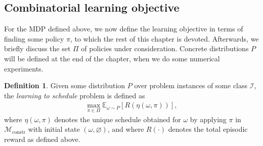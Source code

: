 \documentclass{report}
\theoremstyle{definition}
\newtheorem{define}{Definition}[chapter]
\theoremstyle{plain}
\newtheorem*{remark}{Remark}
\begin{document}

\clearpage
\subsection{Combinatorial learning objective}

For the MDP defined above, we now define the learning objective in terms of
finding some policy $\pi$, to which the rest of this chapter is devoted.
%
Afterwards, we briefly discuss the set $\Pi$ of policies under consideration.
Concrete distributions $P$ will be defined at the end of the chapter, when we do
some numerical experiments.

\begin{mdframed}[%
  innertopmargin=0.3em,
  innerbottommargin=0.9em,
  skipabove=1.5em,
  skipbelow=4em,
]
  \begin{define}
    Given some distribution $P$ over problem instances of some class
    $\mathcal{I}$, the \emph{learning to schedule} problem is defined as
    \begin{align}\label{eq:MDP}
      \tag{MDP}
      \max_{\pi \in \Pi} \mathbb{E}_{\omega \sim P} [R(\eta(\omega, \pi))] ,
    \end{align}
    where $\eta(\omega, \pi)$ denotes the unique schedule obtained for $\omega$ by applying
    $\pi$ in $\mathcal{M}_\mathrm{constr}$ with initial state $(\omega, \varnothing)$, and where
    $R(\cdot)$ denotes the total episodic reward as defined above.
  \end{define}
\end{mdframed}
\end{document}
